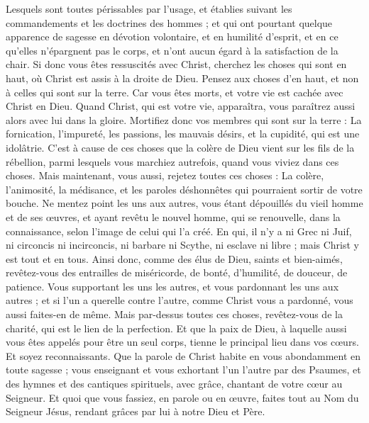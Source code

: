 \begin{multicols}{2}
Lesquels sont toutes périssables par l'usage, et établies suivant les commandements et les doctrines des hommes ; 
et qui ont pourtant quelque apparence de sagesse en dévotion volontaire, et en humilité d'esprit, et en ce qu'elles n'épargnent pas le corps, et n'ont aucun égard à la satisfaction de la chair.
\VerseOne{}Si donc vous êtes ressuscités avec Christ, cherchez les choses qui sont en haut, où Christ est assis à la droite de Dieu.
Pensez aux choses d'en haut, et non à celles qui sont sur la terre.
Car vous êtes morts, et votre vie est cachée avec Christ en Dieu.
Quand Christ, qui est votre vie, apparaîtra, vous paraîtrez aussi alors avec lui dans la gloire.
Mortifiez donc vos membres qui sont sur la terre : La fornication, l'impureté, les passions, les mauvais désirs, et la cupidité, qui est une idolâtrie.
C'est à cause de ces choses que la colère de Dieu vient sur les fils de la rébellion,
parmi lesquels vous marchiez autrefois, quand vous viviez dans ces choses.
Mais maintenant, vous aussi, rejetez toutes ces choses : La colère, l'animosité, la médisance, et les paroles déshonnêtes qui pourraient sortir de votre bouche.
Ne mentez point les uns aux autres, vous étant dépouillés du vieil homme et de ses œuvres,
et ayant revêtu le nouvel homme, qui se renouvelle, dans la connaissance, selon l'image de celui qui l'a créé.
En qui, il n'y a ni Grec ni Juif, ni circoncis ni incirconcis, ni barbare ni Scythe, ni esclave ni libre ; mais Christ y est tout et en tous.
Ainsi donc, comme des élus de Dieu, saints et bien-aimés, revêtez-vous des entrailles de miséricorde, de bonté, d'humilité, de douceur, de patience.
Vous supportant les uns les autres, et vous pardonnant les uns aux autres ; et si l'un a querelle contre l'autre, comme Christ vous a pardonné, vous aussi faites-en de même.
Mais par-dessus toutes ces choses, revêtez-vous de la charité, qui est le lien de la perfection.
Et que la paix de Dieu, à laquelle aussi vous êtes appelés pour être un seul corps, tienne le principal lieu dans vos cœurs. Et soyez reconnaissants.
Que la parole de Christ habite en vous abondamment en toute sagesse ; vous enseignant et vous exhortant l'un l'autre par des Psaumes, et des hymnes et des cantiques spirituels, avec grâce, chantant de votre cœur au Seigneur.
Et quoi que vous fassiez, en parole ou en œuvre, faites tout au Nom du Seigneur Jésus, rendant grâces par lui à notre Dieu et Père.

\end{multicols}

